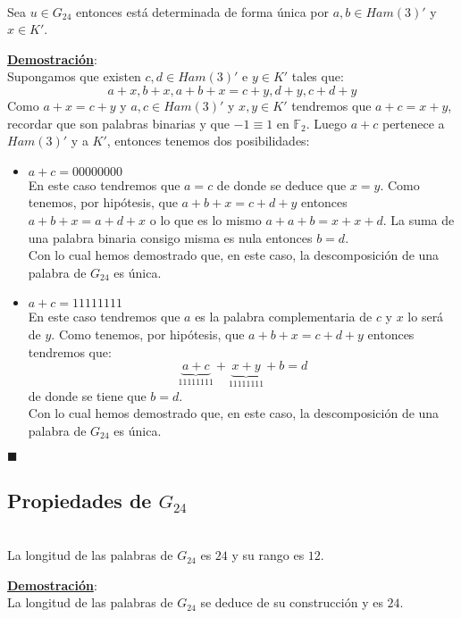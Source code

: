\begin{proposicion}
\ \\
Sea $u\in G_{24}$ entonces est\'a determinada de forma \'unica por
$a,b\in Ham(3)'$ y $x\in K'$.
\end{proposicion}
\underline{\textbf{Demostraci\'on}}:\\
Supongamos que existen $c,d\in Ham(3)'$ e $y\in K'$ tales que:
\begin{displaymath}
a+x,b+x,a+b+x=c+y,d+y,c+d+y
\end{displaymath}
Como $a+x=c+y$ y $a,c\in Ham(3)'$ y $x,y\in K'$ tendremos que $a+c=x+y$,
recordar que son palabras binarias y que $-1\equiv 1$ en $\mathbb{F}_2$.
Luego $a+c$ pertenece a $Ham(3)'$ y a $K'$, entonces tenemos dos posibilidades:
\begin{itemize}
\item $a+c=00000000$\\

En este caso tendremos que $a=c$ de donde se deduce que $x=y$. Como tenemos, por
hip\'otesis, que $a+b+x=c+d+y$ entonces $a+b+x=a+d+x$ o lo que es lo mismo
$a+a+b=x+x+d$. La suma de una palabra binaria consigo misma es nula entonces
$b=d$.\\

Con lo cual hemos demostrado que, en este caso, la descomposici\'on de una
palabra de $G_{24}$ es \'unica.
\item $a+c=11111111$\\

En este caso tendremos que $a$ es la palabra complementaria de $c$ y $x$ lo
ser\'a de $y$. Como tenemos, por hip\'otesis, que $a+b+x=c+d+y$ entonces
tendremos que:
\begin{displaymath}
\underbrace{a+c}_{11111111}+\underbrace{x+y}_{11111111}+b=d
\end{displaymath}
de donde se tiene que $b=d$.\\

Con lo cual hemos demostrado que, en este caso, la descomposici\'on de una
palabra de $G_{24}$ es \'unica.
\end{itemize}
\begin{flushright}
$\blacksquare$
\end{flushright}

\subsection{Propiedades de $G_{24}$}

\begin{proposicion}
\ \\
La longitud de las palabras de $G_{24}$ es $24$ y su rango es $12$.
\end{proposicion}
\underline{\textbf{Demostraci\'on}}:\\
La longitud de las palabras de $G_{24}$ se deduce de su construcci\'on y es
$24$.\\

